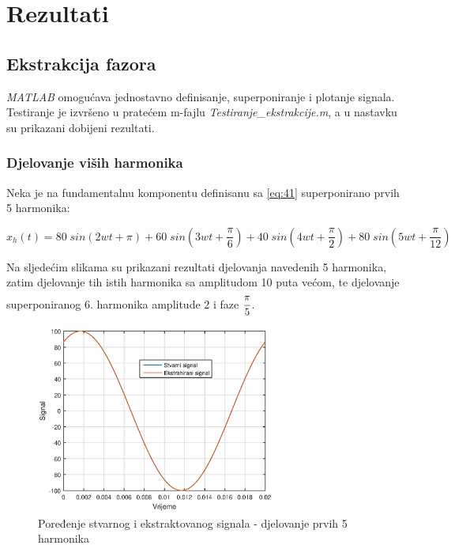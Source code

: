 \chapter{Rezultati}
\label{rez}

\section{Ekstrakcija fazora}

\textit{MATLAB} omogućava jednostavno definisanje, superponiranje i plotanje signala. Testiranje je izvršeno u pratećem m-fajlu \textit{Testiranje\_ekstrakcije.m}, a u nastavku su prikazani dobijeni rezultati.

\subsection{Djelovanje viših harmonika}

Neka je na fundamentalnu komponentu definisanu sa \ref{eq:41} superponirano prvih 5 harmonika:

\begin{equation}
    x_h(t) = 80\;sin(2wt + \pi) + 60\;sin(3wt + \frac{\pi}{6}) + 40\;sin(4wt + \frac{\pi}{2}) + 80\;sin(5wt + \frac{\pi}{12})
    \label{eq:51}
\end{equation}

Na sljedećim slikama su prikazani rezultati djelovanja navedenih 5 harmonika, zatim djelovanje tih istih harmonika sa amplitudom 10 puta većom, te djelovanje superponiranog 6. harmonika amplitude 2 i faze $\cfrac{\pi}{5}$.

\begin{figure}[H]
  \centering
  \includegraphics[width=0.7\textwidth]{Slike_rezultati/Test_h1.eps}
  \caption{Poređenje stvarnog i ekstraktovanog signala - djelovanje prvih 5 harmonika}
  \label{fig:51}
\end{figure}

